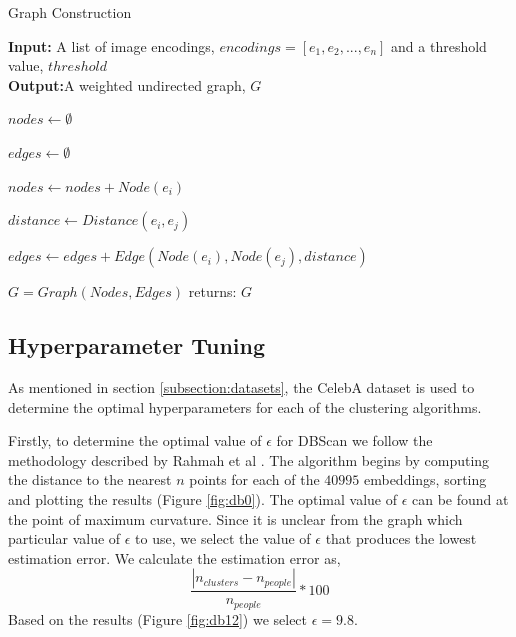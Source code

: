 \documentclass[a4paper,12pt]{report}
\begin{document}
\begin{algorithm}[!htbp]
\small
\caption{Graph Construction}
\hspace*{\algorithmicindent} \textbf{Input:} A list of image encodings, $encodings = [e_1, e_2, ..., e_n]$ and a threshold value, $threshold$ \\
\hspace*{\algorithmicindent} \textbf{Output:}A weighted undirected graph, $G$
\label{Algorithm:graph_con}
\begin{algorithmic}[1]
    \State $nodes \gets \emptyset$
    
    \State $edges \gets \emptyset$
    
        \State $nodes \gets nodes + Node(e_i)$
        
            \State $distance \gets Distance(e_i, e_j)$
            
                \State $edges \gets edges + Edge(Node(e_i), Node(e_j), distance)$
            \EndIf
        \EndFor
    \EndFor

\State $G = Graph(Nodes, Edges)$
\State returns: $G$
\Statex
\end{algorithmic}
  \vspace{-0.4cm}%
\end{algorithm}

\subsection{Hyperparameter Tuning}
\label{subsection:hyper_tuning}

As mentioned in section \ref{subsection:datasets}, the CelebA dataset is used to determine the optimal hyperparameters for each of the clustering algorithms.

Firstly, to determine the optimal value of $\epsilon$ for DBScan we follow the methodology described by Rahmah et al \cite{rahmah2016determination}. The algorithm begins by computing the distance to the nearest $n$ points for each of the $40995$ embeddings, sorting and plotting the results (Figure \ref{fig:db0}). The optimal value of $\epsilon$ can be found at the point of maximum curvature. Since it is unclear from the graph which particular value of $\epsilon$ to use, we select the value of $\epsilon$ that produces the lowest estimation error. We calculate the estimation error as,
\[\frac{|n_{clusters} - n_{people}|}{n_{people}} * 100\]
Based on the results (Figure \ref{fig:db12}) we select $\epsilon=9.8$. 
\end{document}
